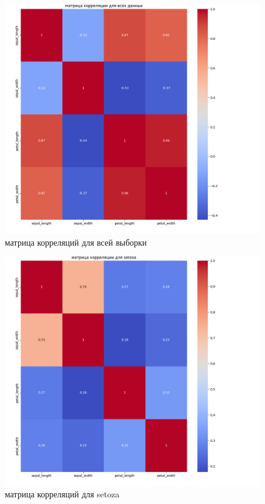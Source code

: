\documentclass[12pt]{report}
\begin{document}
\begin{figure}[h!]
  \centering
  \includegraphics[width = \linewidth /2]{whole_matrix.png}
  \caption{матрица корреляций для всей выборки}
  \label{fig:whole}
\end{figure}

\begin{figure}[h!]
  \centering
  \includegraphics[width = \linewidth /2]{matrix_setosa.png}
  \caption{матрица корреляций для setoza}
  \label{fig:setoza}
\end{figure}
\end{document}
